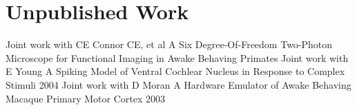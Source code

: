 \documentclass[10pt,colorlinks=true,urlcolor=blue]{moderncv}
\begin{document}
\section{Unpublished Work}
\cventry {} {Joint work with CE Connor CE, et al} {A Six Degree-Of-Freedom Two-Photon Microscope for Functional Imaging in Awake Behaving Primates}{} {}{}
\cventry{} {Joint work with E Young} {A Spiking Model of Ventral Cochlear Nucleus in Response to Complex Stimuli} {2004}{}{}
\cventry{} {Joint work with D Moran} {A Hardware Emulator of Awake Behaving Macaque Primary Motor Cortex} {2003} {}{}
\end{document}
